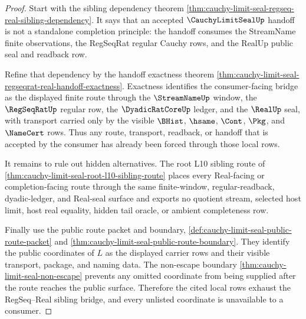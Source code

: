 \begin{proof}
Start with the sibling dependency theorem \autoref{thm:cauchy-limit-seal-regseq-real-sibling-dependency}. It says that an accepted $\CauchyLimitSealUp$ handoff is not a standalone completion principle: the handoff consumes the StreamName finite observations, the RegSeqRat regular Cauchy rows, and the RealUp public seal and readback row.

Refine that dependency by the handoff exactness theorem \autoref{thm:cauchy-limit-seal-regseqrat-real-handoff-exactness}. Exactness identifies the consumer-facing bridge as the displayed finite route through the $\StreamNameUp$ window, the $\RegSeqRatUp$ regular row, the $\DyadicRatCoreUp$ ledger, and the $\RealUp$ seal, with transport carried only by the visible $\BHist$, $\hsame$, $\Cont$, $\Pkg$, and $\NameCert$ rows. Thus any route, transport, readback, or handoff that is accepted by the consumer has already been forced through those local rows.

It remains to rule out hidden alternatives. The root L10 sibling route of \autoref{thm:cauchy-limit-seal-root-l10-sibling-route} places every Real-facing or completion-facing route through the same finite-window, regular-readback, dyadic-ledger, and Real-seal surface and exports no quotient stream, selected host limit, host real equality, hidden tail oracle, or ambient completeness row.

Finally use the public route packet and boundary, \autoref{def:cauchy-limit-seal-public-route-packet} and \autoref{thm:cauchy-limit-seal-public-route-boundary}. They identify the public coordinates of $L$ as the displayed carrier rows and their visible transport, package, and naming data. The non-escape boundary \autoref{thm:cauchy-limit-seal-non-escape} prevents any omitted coordinate from being supplied after the route reaches the public surface. Therefore the cited local rows exhaust the RegSeq--Real sibling bridge, and every unlisted coordinate is unavailable to a consumer.
\end{proof}

